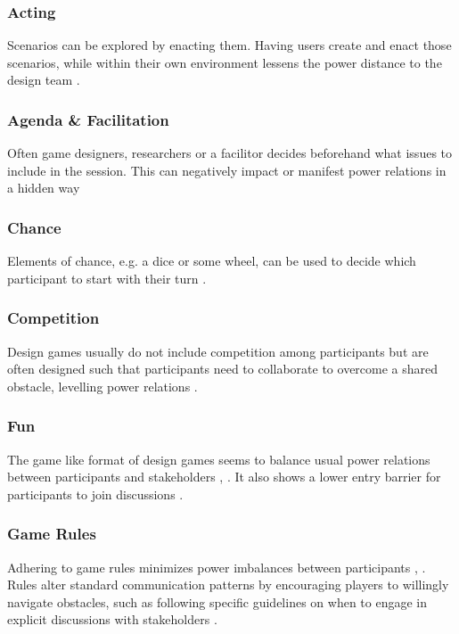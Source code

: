 \documentclass[draft,twoside]{vutinfth}
\begin{document}
            \subsubsection{Acting}
            Scenarios can be explored by enacting them. Having users create and enact those scenarios, while within their own environment 
            lessens the power distance to the design team \cite{brandtDesigningExploratoryDesign2006}.

            \subsubsection{Agenda \& Facilitation}
            Often game designers, researchers or a facilitor decides beforehand what issues to include in the session. 
            This can negatively impact or manifest power relations in a hidden way \cite{eriksenTakingDesignGames2014}

            \subsubsection{Chance}
            Elements of chance, e.g. a dice or some wheel, can be used to decide which participant to start with their turn \cite{gudiksenExplicatingStakeholderCriteria2017}.

            \subsubsection{Competition}
            Design games usually do not include competition among participants but are often designed such that participants need 
            to collaborate to overcome a shared obstacle, levelling power relations \cite{fikarGroundedTheoryZur2023}.

            \subsubsection{Fun}
            The game like format of design games seems to balance usual power relations between participants and stakeholders \cite{gudiksenExplicatingStakeholderCriteria2017}, 
            \cite{zhangAddressingCulturalInertias2024}. It also shows a lower entry barrier for participants to join discussions \cite{nymarkernstsenTechnologyCardsDesign2023}. 

            \subsubsection{Game Rules}
            Adhering to game rules minimizes power imbalances between participants \cite{brandtFacilitatingCollaborationDesign2004a}, \cite{brandtDesigningExploratoryDesign2006}. 
            Rules alter standard communication patterns by encouraging players to willingly navigate obstacles, such as following specific guidelines 
            on when to engage in explicit discussions with stakeholders \cite{zhangAddressingCulturalInertias2024}. 
\end{document}
